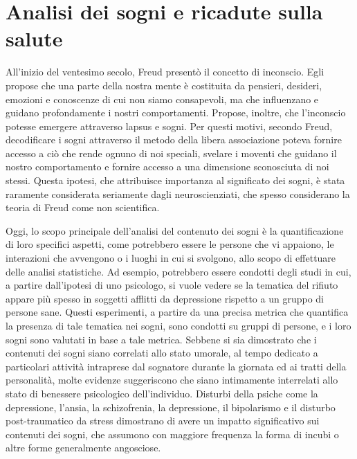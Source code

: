 \section{Analisi dei sogni e ricadute sulla salute}

All'inizio del ventesimo secolo, Freud presentò il concetto di inconscio.
Egli propose che una parte della nostra mente è costituita da pensieri, desideri, emozioni e conoscenze di cui non
siamo consapevoli, ma che influenzano e guidano profondamente i nostri comportamenti.
Propose, inoltre, che l'inconscio potesse emergere attraverso lapsus e sogni.
Per questi motivi, secondo Freud, decodificare i sogni attraverso il metodo della libera associazione poteva
fornire accesso a ciò che rende ognuno di noi speciali, svelare i moventi che guidano il nostro comportamento e
fornire accesso a una dimensione sconosciuta di noi stessi.
Questa ipotesi, che attribuisce importanza al significato dei sogni, è stata raramente considerata seriamente
dagli neuroscienziati, che spesso considerano la teoria di Freud come non scientifica.

Oggi, lo scopo principale dell'analisi del contenuto dei sogni è la quantificazione di loro specifici aspetti,
come potrebbero essere le persone che vi appaiono, le interazioni che avvengono o i luoghi in cui si svolgono,
allo scopo di effettuare delle analisi statistiche.
Ad esempio, potrebbero essere condotti degli studi in cui, a partire dall'ipotesi di uno psicologo, si vuole
vedere se la tematica del rifiuto appare più spesso in soggetti afflitti da depressione rispetto a un gruppo
di persone sane.
Questi esperimenti, a partire da una precisa metrica che quantifica la presenza di tale tematica nei
sogni, sono condotti su gruppi di persone, e i loro sogni sono valutati in base a tale metrica.
Sebbene si sia dimostrato che i contenuti dei sogni siano correlati allo stato umorale, al tempo
dedicato a particolari attività intraprese dal sognatore durante la giornata ed ai tratti della personalità,
molte evidenze suggeriscono che siano intimamente interrelati allo stato di benessere psicologico dell'individuo.
Disturbi della psiche come la depressione, l'ansia, la schizofrenia, la depressione, il bipolarismo e
il disturbo post-traumatico da stress dimostrano di avere un impatto significativo sui contenuti dei sogni,
che assumono con maggiore frequenza la forma di incubi o altre forme generalmente angosciose.

